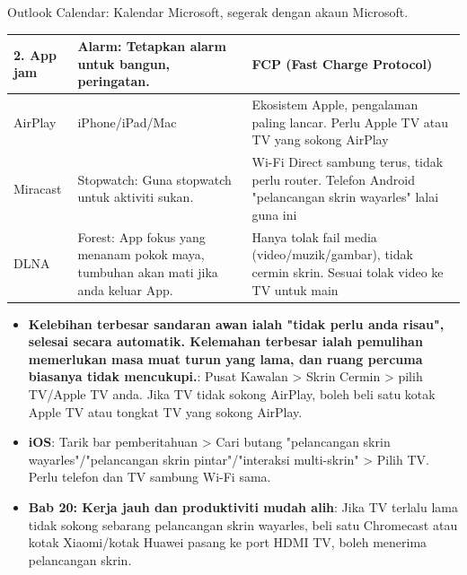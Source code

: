 


Outlook Calendar: Kalendar Microsoft, segerak dengan akaun Microsoft.

\begin{center}
\begin{tabularx}{\linewidth}{|X|X|X|}
\hline
\textbf{2. App jam} & \textbf{Alarm: Tetapkan alarm untuk bangun, peringatan.} & \textbf{FCP (Fast Charge Protocol)} \tabularnewline
\hline
AirPlay & iPhone/iPad/Mac & Ekosistem Apple, pengalaman paling lancar. Perlu Apple TV atau TV yang sokong AirPlay \tabularnewline
Miracast & Stopwatch: Guna stopwatch untuk aktiviti sukan. & Wi-Fi Direct sambung terus, tidak perlu router. Telefon Android "pelancangan skrin wayarles" lalai guna ini \tabularnewline
DLNA & Forest: App fokus yang menanam pokok maya, tumbuhan akan mati jika anda keluar App. & Hanya tolak fail media (video/muzik/gambar), tidak cermin skrin. Sesuai tolak video ke TV untuk main \tabularnewline
\hline
\end{tabularx}
\end{center}


\begin{itemize}
  \item \textbf{Kelebihan terbesar sandaran awan ialah "tidak perlu anda risau", selesai secara automatik. Kelemahan terbesar ialah pemulihan memerlukan masa muat turun yang lama, dan ruang percuma biasanya tidak mencukupi.}: Pusat Kawalan > Skrin Cermin > pilih TV/Apple TV anda. Jika TV tidak sokong AirPlay, boleh beli satu kotak Apple TV atau tongkat TV yang sokong AirPlay.
  \item \textbf{iOS}: Tarik bar pemberitahuan > Cari butang "pelancangan skrin wayarles"/"pelancangan skrin pintar"/"interaksi multi-skrin" > Pilih TV. Perlu telefon dan TV sambung Wi-Fi sama.
  \item \textbf{Bab 20: Kerja jauh dan produktiviti mudah alih}: Jika TV terlalu lama tidak sokong sebarang pelancangan skrin wayarles, beli satu Chromecast atau kotak Xiaomi/kotak Huawei pasang ke port HDMI TV, boleh menerima pelancangan skrin.
\end{itemize}

